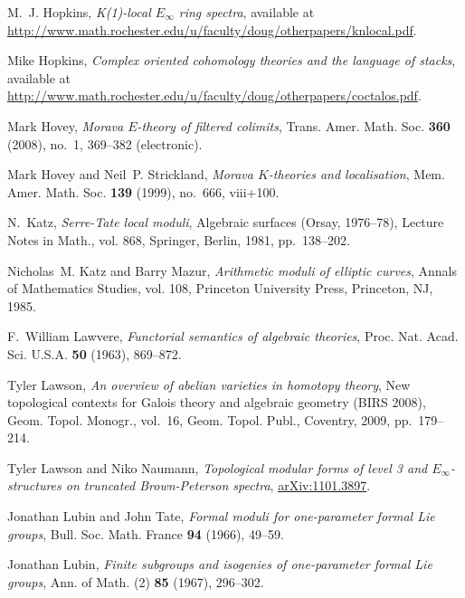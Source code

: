 \documentclass{gtpart}
\theoremstyle{definition}
\theoremstyle{remark}
\begin{document}
\begin{thebibliography}
M.~J. Hopkins, \emph{K(1)-local ${E}_\infty$ ring spectra}, available at
  \url{http://www.math.rochester.edu/u/faculty/doug/otherpapers/knlocal.pdf}.

Mike Hopkins, \emph{Complex oriented cohomology theories and the language of
  stacks}, available at
  \url{http://www.math.rochester.edu/u/faculty/doug/otherpapers/coctalos.pdf}.

Mark Hovey, \emph{Morava {$E$}-theory of filtered colimits}, Trans. Amer. Math.
  Soc. \textbf{360} (2008), no.~1, 369--382 (electronic). 

Mark Hovey and Neil~P. Strickland, \emph{Morava {$K$}-theories and
  localisation}, Mem. Amer. Math. Soc. \textbf{139} (1999), no.~666, viii+100.

N.~Katz, \emph{Serre-{T}ate local moduli}, Algebraic surfaces ({O}rsay,
  1976--78), Lecture Notes in Math., vol. 868, Springer, Berlin, 1981,
  pp.~138--202. 

Nicholas~M. Katz and Barry Mazur, \emph{Arithmetic moduli of elliptic curves},
  Annals of Mathematics Studies, vol. 108, Princeton University Press,
  Princeton, NJ, 1985. 

F.~William Lawvere, \emph{Functorial semantics of algebraic theories}, Proc.
  Nat. Acad. Sci. U.S.A. \textbf{50} (1963), 869--872. 

Tyler Lawson, \emph{An overview of abelian varieties in homotopy theory}, New
  topological contexts for {G}alois theory and algebraic geometry ({BIRS}
  2008), Geom. Topol. Monogr., vol.~16, Geom. Topol. Publ., Coventry, 2009,
  pp.~179--214. 

Tyler Lawson and Niko Naumann, \emph{Topological modular forms of level 3 and
  ${E}_\infty$-structures on truncated {B}rown-{P}eterson spectra},
  \href{http://arxiv.org/abs/1101.3897}{arXiv:1101.3897}.

Jonathan Lubin and John Tate, \emph{Formal moduli for one-parameter formal
  {L}ie groups}, Bull. Soc. Math. France \textbf{94} (1966), 49--59.

Jonathan Lubin, \emph{Finite subgroups and isogenies of one-parameter formal
  {L}ie groups}, Ann. of Math. (2) \textbf{85} (1967), 296--302. 


\end{thebibliography}
\end{document}
